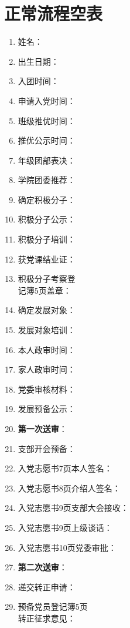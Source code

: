 \documentclass[fontset=windows]{ctexart}
\begin{document}
\newpage
\section{正常流程空表}
\begin{tcolorbox}
    \begin{multicols}{2}
        \begin{enumerate}
            \item 姓名：
            \item 出生日期：
            \item 入团时间：
            \item 申请入党时间：
            \item 班级推优时间：
            \item 推优公示时间：
            \item 年级团部表决：
            \item 学院团委推荐：
            \item 确定积极分子：
            \item 积极分子公示：
            \item 积极分子培训：
            \item 获党课结业证：
            \item 积极分子考察登\\记簿5页盖章：
            \item 确定发展对象：
            \item 发展对象培训：
            \item 本人政审时间：
            \item 家人政审时间：
            \item 党委审核材料：
            \item 发展预备公示：
            \item \textbf{第一次送审}：
            \item 支部开会预备：
            \item 入党志愿书7页本人签名：
            \item 入党志愿书8页介绍人签名：
            \item 入党志愿书9页支部大会接收：
            \item 入党志愿书9页上级谈话：
            \item 入党志愿书10页党委审批：
            \item \textbf{第二次送审}：
            \item 递交转正申请：
            \item 预备党员登记簿5页\\转正征求意见：

\end{enumerate}
\end{multicols}
\end{tcolorbox}
\end{document}
